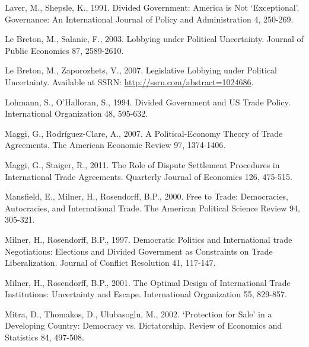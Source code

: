 \documentclass[10pt]{article}
\begin{document}
\begin{list}{}{\setlength{\leftmargin}{0.0in}\setlength{\rightmargin}{0.0in}\setlength{\itemindent}{0.0in}\setlength{\itemsep}{0.1in}}
\item Laver, M., Shepsle, K., 1991. Divided Government: America is Not `Exceptional'. Governance: An International Journal of Policy and Administration 4, 250-269.

\item Le Breton, M., Salanie, F., 2003. Lobbying under Political Uncertainty. Journal of Public Economics 87, 2589-2610.

\item Le Breton, M., Zaporozhets, V., 2007. Legislative Lobbying under Political Uncertainty. Available at SSRN: \url{http://ssrn.com/abstract=1024686}.

\item Lohmann, S., O'Halloran, S., 1994. Divided Government and US Trade Policy. International Organization 48, 595-632.

\item Maggi, G., Rodr\'{i}guez-Clare, A., 2007. A Political-Economy Theory of Trade Agreements. The American Economic Review 97, 1374-1406.

\item Maggi, G., Staiger, R., 2011. The Role of Dispute Settlement Procedures in International Trade Agreements. Quarterly Journal of Economics 126, 475-515.

\item Mansfield, E., Milner, H., Rosendorff, B.P., 2000. Free to Trade: Democracies, Autocracies, and International Trade. The American Political Science Review 94, 305-321.


\item Milner, H., Rosendorff, B.P., 1997. Democratic Politics and International trade Negotiations: Elections and Divided Government as Constraints on Trade Liberalization. Journal of Conflict Resolution 41, 117-147.

\item Milner, H., Rosendorff, B.P., 2001. The Optimal Design of International Trade Institutions: Uncertainty and Escape. International Organization 55, 829-857.

\item Mitra, D., Thomakos, D., Ulubasoglu, M., 2002. `Protection for Sale' in a Developing Country: Democracy vs. Dictatorship. Review of Economics and Statistics 84, 497-508.


\end{list}
\end{document}
